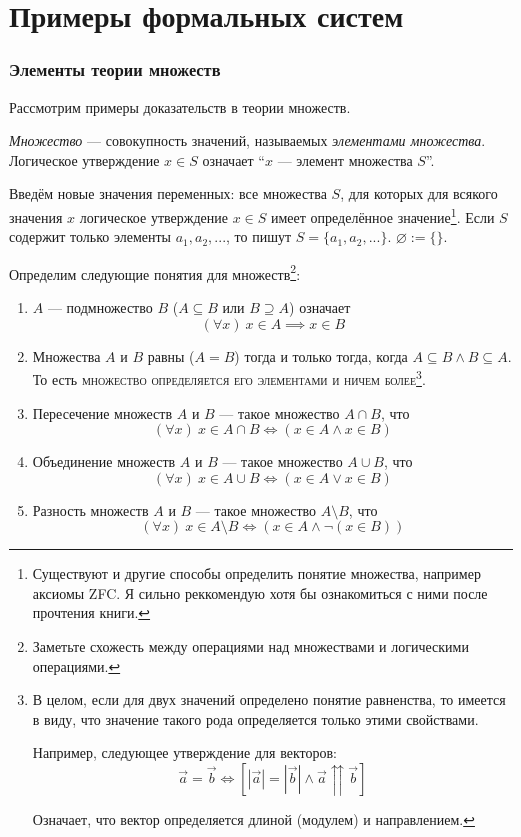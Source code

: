 \pagebreak

\part{Примеры формальных систем}

\section{Элементы теории множеств}

Рассмотрим примеры доказательств в теории множеств.

{\it Множество} --- совокупность значений, называемых {\it элементами множества}.
Логическое утверждение $x\in S$ означает ``$x$ --- элемент множества $S$''.

Введём новые значения переменных: все множества $S$, для которых для
всякого значения $x$ логическое утверждение ${x\in S}$ имеет определённое
значение\footnote{Существуют и другие способы определить
	понятие множества, например аксиомы ZFC. Я сильно реккомендую
	хотя бы ознакомиться с ними после прочтения книги.}.
Если $S$ содержит только элементы $a_1,a_2,...$, то пишут $S=\{a_1,a_2,...\}$.
$\varnothing:=\{\}$.

Определим следующие понятия для множеств\footnote{Заметьте схожесть между операциями
	над множествами и логическими операциями.}:
\begin{enumerate}
	\item{}$A$ --- подмножество $B$ (${A\subseteq B}$ или $B\supseteq A$) означает
	\[
		(\forall x)~x\in A\implies x\in B
	\]

	\item{}Множества $A$ и $B$ равны ($A=B$) тогда и только тогда, когда
	$A\subseteq B\land B\subseteq A$.
	То есть \textsc{множество определяется его элементами и ничем более}\footnote{
		В целом, если для двух значений определено понятие равненства,
		то имеется в виду, что значение такого рода определяется только этими
		свойствами.

		Например, следующее утверждение для векторов:
		\[
			\vec{a}=\vec{b}\iff\left[|\vec{a}|=|\vec{b}|\land
				\vec{a}\upuparrows\vec{b}\right]
		\]

		Означает, что вектор определяется длиной (модулем) и направлением.
	}.

	\item{}Пересечение множеств $A$ и $B$ --- такое множество $A\cap B$, что
	\[
		(\forall x)~x\in A\cap B\iff(x\in A\land x\in B)
	\]

	\item{}Объединение множеств $A$ и $B$ --- такое множество $A\cup B$, что
	\[
		(\forall x)~x\in A\cup B\iff (x\in A\lor x\in B)
	\]

	\item{}Разность множеств $A$ и $B$ --- такое множество $A\setminus B$, что
	\[
		(\forall x)~x\in A\setminus B\iff (x\in A\land \lnot(x\in B))
	\]
\end{enumerate}


